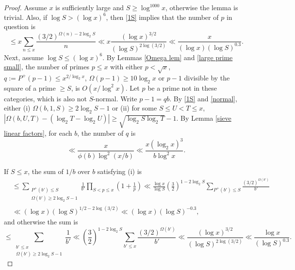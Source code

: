 \documentclass[11pt]{amsart}
\theoremstyle{remark}
\theoremstyle{plain}
\numberwithin{equation}{section}
\renewcommand{\(}{\left(}
\renewcommand{\)}{\right)}
\newcommand{\pfrac}[2]{\left(\frac{#1}{#2}\right)}
\renewcommand{\le}{\leqslant}
\renewcommand{\ge}{\geqslant}
\newcommand{\om}{\Omega}
\begin{document}
\begin{proof}
Assume $x$ is sufficiently large and $S \ge \log^{1000} x$, otherwise the
lemma is trivial.  Also, if $\log S > (\log x)^6$, then \eqref{1S} implies
that the number of $p$ in question is
$$
\le x \sum_{n\le x} \frac{(3/2)^{\om(n)-2\log_2 S}}{n}
\ll x \frac{(\log x)^{3/2}}{(\log S)^{2\log(3/2)}} \ll \frac{x}{(\log x)(\log S)^{0.3}}.
$$  
Next, assume $\log S \le (\log x)^6$.
By Lemmas \ref{Omega lem} and \ref{large prime small},
the number of
primes $p\le x$ with either $p<\sqrt{x}$, $q:=P^+(p-1)\le x^{2/\log_2 x}$,
$\om(p-1) \ge 10\log_2 x$ or $p-1$ divisible by
the square of a prime $\ge S$, is $O(x/\log^2 x)$.
Let $p$ be a prime not in these categories, which is also not $S$-normal.
Write $p-1=qb$.  By \eqref{1S}
and \eqref{normal}, either (i) $\om(b,1,S)\ge 2\log_2 S-1$ or (ii) for some
$S\le U<T\le x$, $|\om(b,U,T)-(\log_2 T-\log_2 U)|\ge \sqrt{\log_2 S\log_2 T}
-1$.
By Lemma \ref{sieve linear factors}, for each $b$, the number of $q$ is
$$
\ll \frac{x}{\phi(b)\log^2 (x/b)} \ll \frac{x(\log_2 x)^3}{b\log^2 x}.
$$

If $S\le x$, the sum of $1/b$ over $b$ satisfying (i) is
\begin{align*}
&\le \sum_{\substack{P^+(b')\le S \\
  \om(b')\ge 2\log_2 S-1 }} \frac1{b'} \prod_{S<p\le x} \(1+\frac{1}{p} \)
  \ll \frac{\log x}{\log S} \pfrac32^{1-2\log_2 S} \sum_{P^+(b')\le S}
  \frac{(3/2)^{\om(b')}}{b'} \\
&\ll (\log x)(\log S)^{1/2-2\log(3/2)} \ll (\log x)(\log S)^{-0.3},
\end{align*}
and otherwise the sum is
$$
\le \sum_{\substack{b'\le x \\ \Omega(b')\ge 2\log_2 S-1}} \frac{1}{b'}
\ll \pfrac32^{1-2\log_2 S} \sum_{b'\le x} \frac{(3/2)^{\om(b')}}{b'}
\ll \frac{(\log x)^{3/2}}{(\log S)^{2\log (3/2)}} \ll \frac{\log x}{(\log S)^{0.3}}.
$$


\end{proof}
\end{document}
